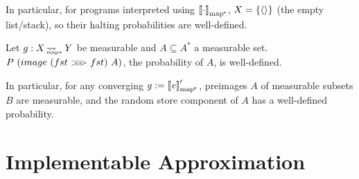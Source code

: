 \documentclass[preprint]{sigplanconf}
\newcommand{\arrow}{\rightsquigarrow}
\newcommand{\arrowcomp}{\ensuremath{{>}\mspace{-6mu}{>}\mspace{-6mu}{>}}}
\newcommand{\pmap}{_\mathrm{map^{\mspace{-2mu}*}}}
\DeclareMathOperator{\pmapto}{\arrow_{\mspace{-22mu}_{\mathrm{map*}}}}
\begin{document}
In particular, for programs interpreted using $\meaningof{\cdot}\pmap$, $X = \{{\langle{}\rangle}\}$ (the empty list/stack), so their halting probabilities are well-defined.

\begin{corollary}
Let $g : X \pmapto Y$ be measurable and $A \subseteq A^*$ a measurable set.
$P~(image~(fst~\arrowcomp~fst)~A)$, the probability of $A$, is well-defined.
\end{corollary}

In particular, for any converging $g := \meaningof{\mathit{e}}\pmap'$, preimages $A$ of measurable subsets $B$ are measurable, and the random store component of $A$ has a well-defined probability.


\section{Implementable Approximation}
\end{document}
